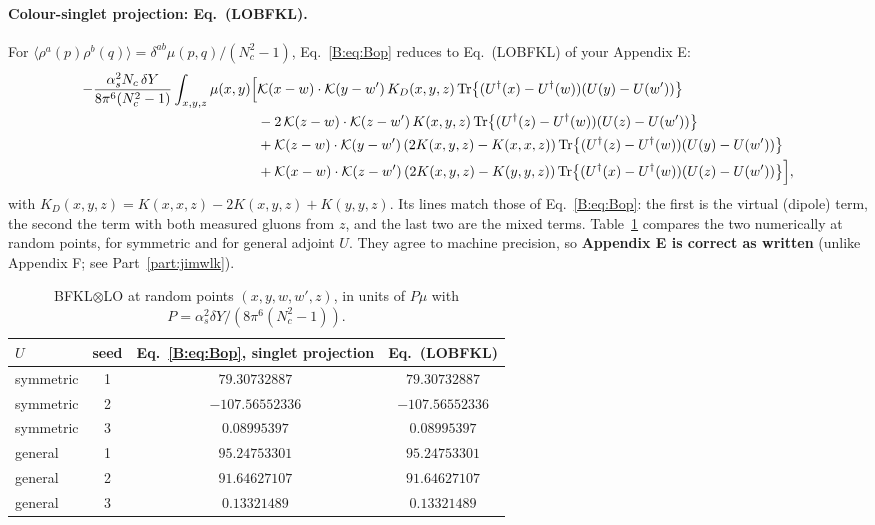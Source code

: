 \documentclass[10pt]{article}
\numberwithin{equation}{section}
\newcommand{\KK}{\mathcal K}
\newcommand{\Ud}{U^{\dagger}}
\newcommand{\Tr}{{\rm Tr}}
\begin{document}
\paragraph{Colour-singlet projection: Eq.~(LOBFKL).} For $\langle\rho^a(p)\rho^b(q)\rangle=\delta^{ab}\mu(p,q)/(N_c^2-1)$, Eq.~\eqref{B:eq:Bop} reduces to Eq.~(LOBFKL) of your Appendix E:
\begin{align}
-\frac{\alpha_s^2N_c\,\delta Y}{8\pi^6(N_c^2-1)}\int_{x,y,z}\mu(x,y)\Big[&\KK(x-w)\cdot\KK(y-w')\,K_D(x,y,z)\,\Tr\big\{(\Ud(x)-\Ud(w))(U(y)-U(w'))\big\}\notag\\
&-2\,\KK(z-w)\cdot\KK(z-w')\,K(x,y,z)\,\Tr\big\{(\Ud(z)-\Ud(w))(U(z)-U(w'))\big\}\notag\\
&+\KK(z-w)\cdot\KK(y-w')\,(2K(x,y,z)-K(x,x,z))\,\Tr\big\{(\Ud(z)-\Ud(w))(U(y)-U(w'))\big\}\notag\\
&+\KK(x-w)\cdot\KK(z-w')\,(2K(x,y,z)-K(y,y,z))\,\Tr\big\{(\Ud(x)-\Ud(w))(U(z)-U(w'))\big\}\Big],
\end{align}
with $K_D(x,y,z)=K(x,x,z)-2K(x,y,z)+K(y,y,z)$. Its lines match those of Eq.~\eqref{B:eq:Bop}: the first is the virtual (dipole) term, the second the term with both measured gluons from $z$, and the last two are the mixed terms. Table~\ref{B:tab:singlet} compares the two numerically at random points, for symmetric and for general adjoint $U$. They agree to machine precision, so \textbf{Appendix E is correct as written} (unlike Appendix F; see Part~\ref{part:jimwlk}).

\begin{table}[H]
\centering\small
\begin{tabular}{@{}l c c c@{}}
$U$ & seed & Eq.~\eqref{B:eq:Bop}, singlet projection & Eq.~(LOBFKL) \\ \hline
symmetric & 1 & $79.30732887$ & $79.30732887$\\
symmetric & 2 & $-107.56552336$ & $-107.56552336$\\
symmetric & 3 & $0.08995397$ & $0.08995397$\\
general & 1 & $95.24753301$ & $95.24753301$\\
general & 2 & $91.64627107$ & $91.64627107$\\
general & 3 & $0.13321489$ & $0.13321489$\\
\end{tabular}
\caption{BFKL$\otimes$LO at random points $(x,y,w,w',z)$, in units of $P\mu$ with $P=\alpha_s^2\delta Y/(8\pi^6(N_c^2-1))$.}\label{B:tab:singlet}
\end{table}
\end{document}
